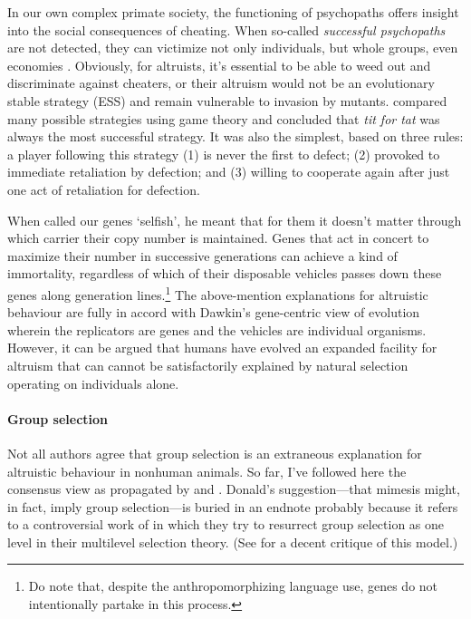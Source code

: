 \documentclass{article}
\begin{document}
In our own complex primate society, the functioning of psychopaths offers
insight into the social consequences of cheating. When so-called
\emph{successful psychopaths} are not detected, they can victimize not only
individuals, but whole groups, even economies \citep{babiak1995, boddy2006,
boddy2010, kirkman2005}. Obviously, for altruists, it's essential to be able to
weed out and discriminate against cheaters, or their altruism would not be an
evolutionary stable strategy (ESS) and remain vulnerable to invasion by
mutants. \citet*{axelrod1981} compared many possible strategies using game
theory and concluded that \emph{tit for tat} was always the most successful
strategy. It was also the simplest, based on three rules: a player following
this strategy (1) is never the first to defect; (2) provoked to immediate
retaliation by defection; and (3) willing to cooperate again after just one act
of retaliation for defection.

When \citet{dawkins1976} called our genes ‘selfish’, he meant that for them it
doesn't matter through which carrier their copy number is maintained. Genes
that act in concert to maximize their number in successive generations can
achieve a kind of immortality, regardless of which of their disposable vehicles
passes down these genes along generation lines.\footnote{Do note that, despite the
anthropomorphizing language use, genes do not intentionally partake in this
process.} The above-mention explanations for altruistic behaviour are fully in
accord with Dawkin's gene-centric view of evolution wherein the replicators are
genes and the vehicles are individual organisms. However, it can be argued that
humans have evolved an expanded facility for altruism that can cannot be
satisfactorily explained by natural selection operating on individuals
alone.

\paragraph{Group selection}

Not all authors agree that group selection is an extraneous explanation for
altruistic behaviour in nonhuman animals. So far, I've followed here the
consensus view as propagated by \citet{hamilton1964} and \citet{dawkins1976}.
Donald's suggestion---that mimesis might, in fact, imply group selection---is
buried in an endnote \citep[p.~338]{donald2001} probably because it refers to a
controversial work of \citet{sober1999} in which they try to resurrect group
selection as one level in their multilevel selection theory. (See
\citealp{dennett2002} for a decent critique of this model.)
\end{document}
